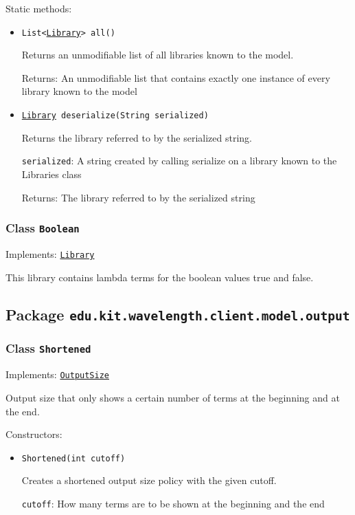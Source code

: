 Static methods:
\begin{itemize}
\item \texttt{List<\hyperref[type:edu.kit.wavelength.client.model.library.Library]{Library}> all()}

Returns an unmodifiable list of all libraries known to the model.

Returns: An unmodifiable list that contains exactly one instance of every
         library known to the model

\item \texttt{\hyperref[type:edu.kit.wavelength.client.model.library.Library]{Library} deserialize(String serialized)}

Returns the library referred to by the serialized string.

\texttt{serialized}: A string created by calling serialize on a library known to the
            Libraries class

Returns: The library referred to by the serialized string

\end{itemize}

\subsubsection{Class \texttt{Boolean}}
\label{type:edu.kit.wavelength.client.model.library.Boolean}
Implements: \texttt{\hyperref[type:edu.kit.wavelength.client.model.library.Library]{Library}}

This library contains lambda terms for the boolean values true and false.

\subsection{Package \lstinline{edu.kit.wavelength.client.model.output}}
\label{pkg:edu.kit.wavelength.client.model.output}


\subsubsection{Class \texttt{Shortened}}
\label{type:edu.kit.wavelength.client.model.output.Shortened}
Implements: \texttt{\hyperref[type:edu.kit.wavelength.client.model.output.OutputSize]{OutputSize}}

Output size that only shows a certain number of terms at the beginning
 and at the end.

Constructors:
\begin{itemize}
\item \texttt{Shortened(int cutoff)}

Creates a shortened output size policy with the given cutoff.

\texttt{cutoff}: How many terms are to be shown at the beginning and the end

\end{itemize}

